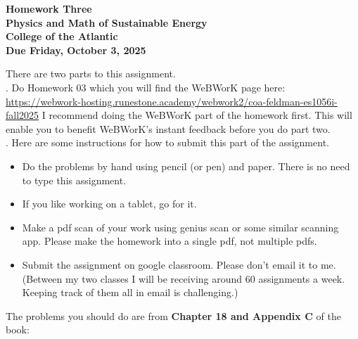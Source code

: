 \documentclass[12pt]{article}
\begin{document}
\pagestyle{empty}
 
\begin{center}
{\LARGE {\bf Homework Three}}\\
\bigskip
{\Large {\bf Physics and Math of Sustainable Energy}}\\
\bigskip
{\Large {\bf College of the Atlantic}}\\
\bigskip
{ {\bf Due Friday, October 3, 2025}}\\ 
\end{center}
\medskip


\noindent There are two parts to this assignment.\\

.  Do Homework 03 which you
will find the WeBWorK page here: \url{https://webwork-hosting.runestone.academy/webwork2/coa-feldman-es1056i-fall2025}
I recommend doing the WeBWorK part of the homework first.  This will
enable you to benefit WeBWorK's instant feedback before you do part
two.\\ 


.  Here are some
instructions for how to submit this part of the assignment.
\begin{itemize}
\item Do the problems by hand using pencil (or pen) and paper.
  There is no need to type this assignment.
\item If you like working on a tablet, go for it. 
\item Make a pdf scan of your work using genius scan or some
  similar scanning app.  Please make the homework into a single
  pdf, not multiple pdfs.
\item Submit the assignment on google classroom.  Please don't
  email it to me.  (Between my two classes I will be receiving
  around 60 assignments a week.  Keeping track of them all in email 
  is challenging.)\\
\end{itemize}

\noindent The problems you should do are from {\bf Chapter 18 and
  Appendix C} of the book: \\
\end{document}
